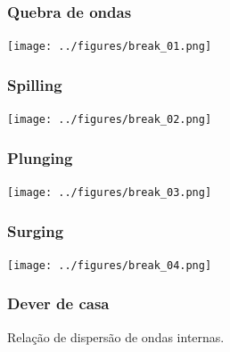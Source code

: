 \begin{frame}
\frametitle{Quebra de ondas}
  \begin{center}
    \texttt{[image: ../figures/break\_01.png]}
  \end{center}
\end{frame}


\begin{frame}
\frametitle{Spilling}
  \begin{center}
    \texttt{[image: ../figures/break\_02.png]}
  \end{center}
\end{frame}


\begin{frame}
\frametitle{Plunging}
  \begin{center}
    \texttt{[image: ../figures/break\_03.png]}
  \end{center}
\end{frame}


\begin{frame}
\frametitle{Surging}
  \begin{center}
    \texttt{[image: ../figures/break\_04.png]}
  \end{center}
\end{frame}


\begin{frame}
\frametitle{Dever de casa}
    \begin{block}{}
      Relação de dispersão de ondas internas.
    \end{block}
\end{frame}


